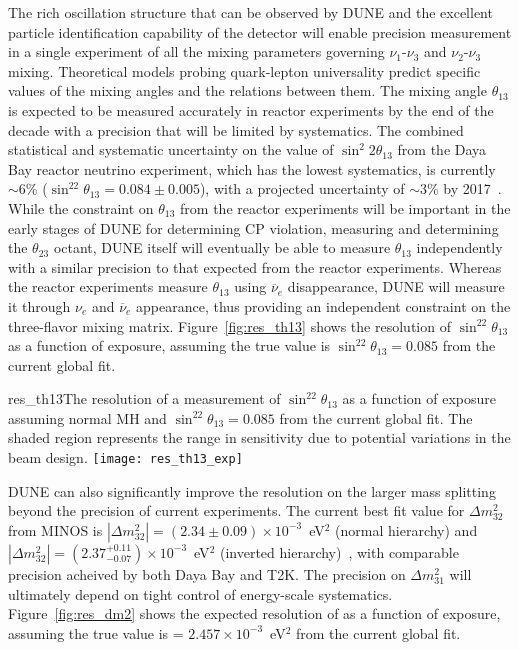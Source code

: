 The rich oscillation structure that can be observed by DUNE and the
excellent particle identification capability of the detector
will enable precision measurement  in a single experiment of all the mixing parameters
governing $\nu_1$-$\nu_3$ and $\nu_2$-$\nu_3$ mixing. Theoretical models probing quark-lepton
universality predict specific values of the mixing angles and the
relations between them. The
mixing angle $\theta_{13}$ is
expected to be measured accurately in reactor experiments by the end
of the decade with a precision that will be limited by
systematics. 
The combined statistical and systematic uncertainty on the value of $\sin ^ 2 2
\theta_{13}$ from the Daya Bay reactor neutrino experiment, which has
the lowest systematics, is currently $\sim6$\% ($\sin^22\theta_{13} = 0.084\pm0.005$),
with a projected uncertainty of $\sim$3\% by 2017~\cite{Zhang:2015fya}.
While the constraint on $\theta_{13}$ from the reactor experiments will be
important in the
early stages of DUNE for determining CP violation, measuring
\deltacp and determining the $\theta_{23}$ octant, 
DUNE itself will eventually be able to measure
$\theta_{13}$ independently with a similar precision to that expected from the reactor experiments. 
Whereas the reactor experiments measure $\theta_{13}$ using $\overline{\nu}_e$
disappearance, DUNE will measure it through $\nu_e$ and
$\overline{\nu}_e$ appearance, thus providing an independent constraint on
the three-flavor mixing matrix.   Figure~\ref{fig:res_th13} shows the resolution of $\sin^22\theta_{13}$ as a function of exposure, assuming the true value is $\sin^22\theta_{13} = 0.085$ from the current global fit.

\begin{cdrfigure}{res_th13}{The resolution of a measurement of $\sin^22\theta_{13}$ as a function of exposure assuming normal MH and $\sin^22\theta_{13} = 0.085$ from the current global fit. The shaded region represents the range in sensitivity due to potential variations in the beam design.  }
 \texttt{[image: res\_th13\_exp]}
\end{cdrfigure}

DUNE can also significantly improve the
resolution on the larger mass splitting beyond the precision of current experiments.  The current best fit value for $\Delta m^2_{32}$ from MINOS is $|\Delta m^2_{32}| = (2.34\pm0.09)\times10^{-3}$~eV$^2$ (normal hierarchy) and $|\Delta m^2_{32}| = (2.37^{+0.11}_{-0.07})\times10^{-3}$~eV$^2$ (inverted hierarchy)~\cite{Sousa:2015bxa}, with comparable precision acheived by both Daya Bay and T2K. The
precision on $\Delta m^2_{31}$ will ultimately depend on tight control
of energy-scale systematics.  Figure~\ref{fig:res_dm2} shows the expected resolution of  as a function of exposure, assuming the true value is  = $2.457\times10^{-3}$~eV$^2$ from the current global fit.

